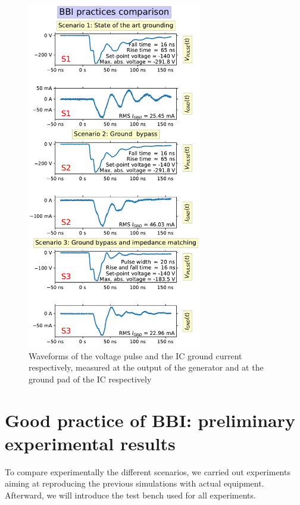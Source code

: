 \documentclass[10pt, conference, compsocconf]{IEEEtran}
\begin{document}
\begin{figure}[!h]
\centering
\includegraphics[width=3in]{realPulsesComparisons.pdf}
\caption{Waveforms of the voltage pulse and the IC ground current respectively, measured at the output of the generator and at the ground pad of the IC respectively}
\label{pulseIgndAll}
\end{figure}

\section{Good practice of BBI:  preliminary experimental results}
To compare experimentally the different scenarios, we carried out experiments aiming at reproducing the previous simulations with actual equipment.
Afterward, we will introduce the test bench used for all experiments.

\end{document}
